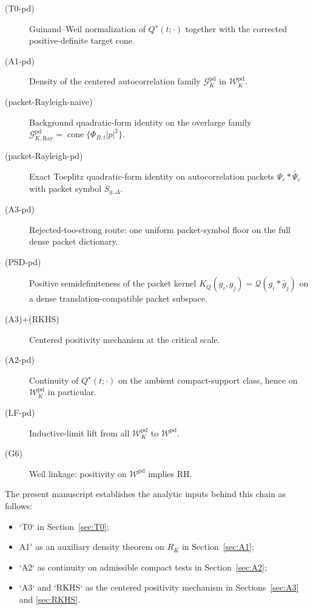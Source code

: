 \begin{description}
  \item[(T0-pd)] Guinand--Weil normalization of $Q^\star(t;\cdot)$ together with the corrected positive-definite target cone.
  \item[(A1-pd)] Density of the centered autocorrelation family $\mathcal G_K^{\mathrm{pd}}$ in $\mathcal W_K^{\mathrm{pd}}$.
  \item[(packet-Rayleigh-naive)] Background quadratic-form identity on the overlarge family $\mathcal G_{K,\mathrm{Ray}}^{\mathrm{pd}}=\operatorname{cone}\{\Phi_{B,t}|p|^2\}$.
  \item[(packet-Rayleigh-pd)] Exact Toeplitz quadratic-form identity on autocorrelation packets $\Psi_c * \widetilde{\Psi_c}$ with packet symbol $S_{g,\Delta}$.
  \item[(A3-pd)] Rejected-too-strong route: one uniform packet-symbol floor on the full dense packet dictionary.
  \item[(PSD-pd)] Positive semidefiniteness of the packet kernel $K_Q(g_i,g_j)=\mathcal Q(g_i * \widetilde{g_j})$ on a dense translation-compatible packet subspace.
  \item[(A3)+(RKHS)] Centered positivity mechanism at the critical scale.
  \item[(A2-pd)] Continuity of $Q^\star(t;\cdot)$ on the ambient compact-support class, hence on $\mathcal W_K^{\mathrm{pd}}$ in particular.
  \item[(LF-pd)] Inductive-limit lift from all $\mathcal W_K^{\mathrm{pd}}$ to $\mathcal W^{\mathrm{pd}}$.
  \item[(G6)] Weil linkage: positivity on $\mathcal W^{\mathrm{pd}}$ implies RH.
\end{description}

The present manuscript establishes the analytic inputs behind this chain as follows:

\begin{itemize}
  \item `T0` in Section~\ref{sec:T0};
  \item \textup{A1$'$} as an auxiliary density theorem on $R_K$ in Section~\ref{sec:A1};
  \item `A2` as continuity on admissible compact tests in Section~\ref{sec:A2};
  \item `A3` and `RKHS` as the centered positivity mechanism in Sections~\ref{sec:A3} and \ref{sec:RKHS}.
\end{itemize}


